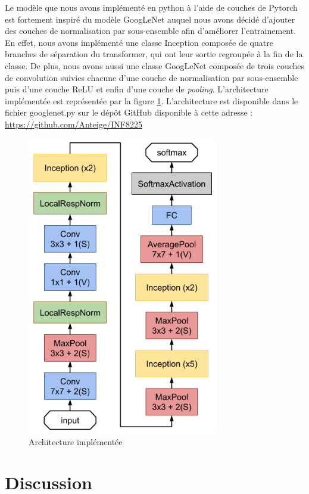 \documentclass{article}
\begin{document}
Le modèle que nous avons implémenté en python à l’aide de couches de Pytorch
est fortement inspiré du modèle GoogLeNet auquel nous avons décidé d’ajouter des
couches de normalisation par sous-ensemble afin d’améliorer l’entrainement. En
effet, nous avons implémenté une classe Inception composée de quatre branches de
séparation du transformer, qui ont leur sortie regroupée à la fin de la classe.
De plus, nous avons aussi une classe GoogLeNet composée de trois couches de
convolution suivies chacune d'une couche de normalisation par sous-ensemble puis
d’une couche ReLU et enfin d’une couche de \textit{pooling}. L'architecture
implémentée est représentée par la figure \ref{8}. L'architecture est disponible
dans le fichier googlenet.py sur le dépôt GitHub disponible à cette adresse :
\url{https://github.com/Anteige/INF8225}

\begin{figure}[htbp]
    \includegraphics[width=8.4cm]{./figures/Figure7bis.png} 
    \caption{Architecture implémentée}
    \label{8} 
\end{figure} 

\section{Discussion}
\end{document}
